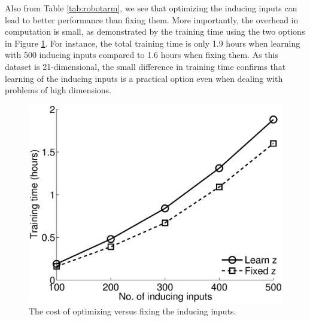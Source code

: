 Also from Table \ref{tab:robotarm}, we see that optimizing the inducing inputs can lead to better performance than fixing them.
More importantly, the overhead in computation is small, as demonstrated by the training time using the two options in Figure \ref{fig:time}.
For instance, the total training time is only 1.9 hours when learning with 500 inducing inputs compared to 1.6 hours when fixing them.
As this dataset is 21-dimensional, the small difference in training time confirms that learning of the inducing inputs is a practical option even when dealing with problems of high dimensions.
\begin{figure}
\includegraphics[width=0.7\linewidth]{figures/sarcosTime.eps}
\caption{The cost of optimizing versus fixing the inducing inputs.}
\label{fig:time}
\end{figure}
